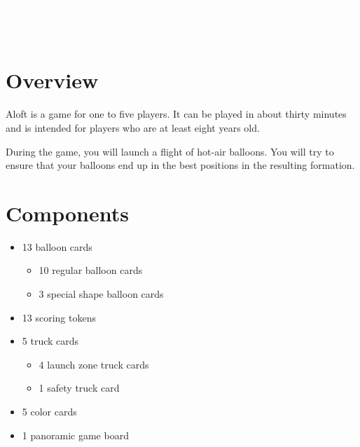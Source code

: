 \documentclass[a6paper, 11pt, parskip=half, DIV=15]{scrartcl}
\begin{document}
\begin{titlepage}

\enlargethispage{3.0\baselineskip}
\Huge
\vspace*{-1.0\baselineskip}
{
\setmainfont[Scale=2.2375]{Oi}
\begin{center}
\textcolor{white}{Aloft}
\end{center}
}
\vfill
\huge
\setmainfont[Scale=1.05]{Playball}
\begin{center}
\textcolor{white}{Designed by Michael Purcell}
\end{center}
\end{titlepage}


\ClearShipoutPicture
\enlargethispage{1.75\baselineskip}
\section*{Overview}
Aloft is a game for one to five players. It can be played in about thirty minutes and is intended for players who are at least eight years old.

During the game, you will launch a flight of hot-air balloons. You will try to ensure that your balloons end up in the best positions in the resulting formation.

\section*{Components}
\begin{itemize}[nosep]
  \item 13 balloon cards
    \begin{itemize}[nosep]
      \item 10 regular balloon cards
      \item 3 special shape balloon cards
    \end{itemize}
  \item 13 scoring tokens
  \item 5 truck cards
    \begin{itemize}[nosep]
      \item 4 launch zone truck cards
      \item 1 safety truck card
    \end{itemize}
  \item 5 color cards
  \item 1 panoramic game board
\end{itemize}
\end{document}
